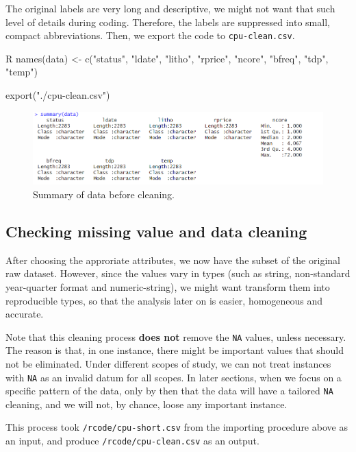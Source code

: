The original labels are very long and descriptive, we might not want that such level of details during coding. Therefore, the labels are suppressed
into small, compact abbreviations. Then, we export the code to \verb|cpu-clean.csv|.

\begin{code}{R}
names(data) <- c("status", "ldate", "litho", 
    "rprice", "ncore", "bfreq", "tdp", 
    "temp")

export("./cpu-clean.csv")
\end{code}

\begin{figure}[H]
    \centering
    \includegraphics[max width=0.7\linewidth]{graphics/new_graphics/New data/summary-of-data-before.png}
    \caption{Summary of data before cleaning.}
\end{figure}

\subsection{Checking missing value and data cleaning}
\label{subsection:data_cleaning}

After choosing the approriate attributes, we now have the subset of the original raw dataset. 
However, since the values vary in types (such as string, non-standard year-quarter format and numeric-string),
we might want transform them into reproducible types, so that the analysis later on is easier, homogeneous and accurate.

Note that this cleaning process \textbf{does not} remove the \texttt{NA} values, unless necessary. The reason is that, 
in one instance, there might be important values that should not be eliminated. Under different scopes of study, we can not treat 
instances with \texttt{NA} as an invalid datum for all scopes. In later sections, when we focus on a specific pattern of the data, only by then
that the data will have a tailored \texttt{NA} cleaning, and we will not, by chance, loose any important instance.

This process took \verb|/rcode/cpu-short.csv| from the importing procedure above as an input, and produce \verb|/rcode/cpu-clean.csv| as
an output.

